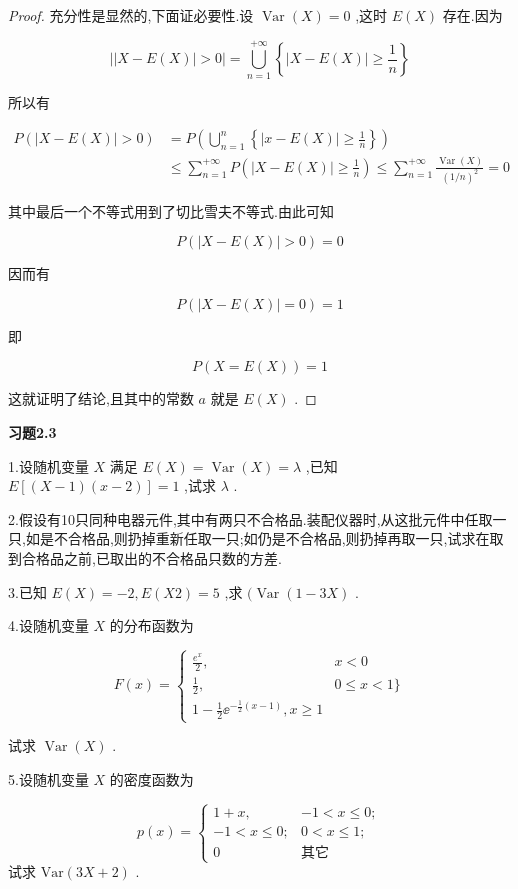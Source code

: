 \begin{proof}
	充分性是显然的,下面证必要性.设 $ \operatorname{Var}(X)=0 $ ,这时 $ E(X) $ 存在.因为
	
	\[
	| | X-E(X)|>0|=\bigcup_{n=1}^{+\infty}\left\{|X-E(X)| \geqslant \frac{1}{n}\right\}
	\]
	
	所以有
	
	\[
	\begin{aligned} P(|X-E(X)|>0) &=P\left(\bigcup_{n=1}^{n}\left\{|x-E(X)| \geqslant \frac{1}{n}\right\}\right) \\ & \leqslant \sum_{n=1}^{+\infty} P\left(|X-E(X)| \geqslant \frac{1}{n}\right) \leqslant \sum_{n=1}^{+\infty} \frac{\operatorname{Var}(X)}{(1 / n)^{2}}=0 \end{aligned}
	\]
	
	其中最后一个不等式用到了切比雪夫不等式.由此可知
	
	\[
	P(|X-E(X)|>0)=0
	\]
	
	因而有
	
	\[
	P(|X-E(X)|=0)=1
	\]
	
	即
	
	\[
	P(X=E(X))=1
	\]
	
	这就证明了结论,且其中的常数 $ a $ 就是 $ E(X) $ .
\end{proof}

\begin{center}
	\textbf{习题2.3}
\end{center}

1.设随机变量 $ X $ 满足 $ E(X)=\operatorname{Var}(X)=\lambda $ ,已知 $ E[(X-1)(x-2)]=1 $ ,试求 $ \lambda $ .

2.假设有10只同种电器元件,其中有两只不合格品.装配仪器时,从这批元件中任取一只,如是不合格品,则扔掉重新任取一只;如仍是不合格品,则扔掉再取一只,试求在取到合格品之前,已取出的不合格品只数的方差.

3.已知 $ E(X)=-2,E(X2)=5 $ ,求 $ (\operatorname{Var}(1-3 X) $ .

4.设随机变量 $ X $ 的分布函数为

\[
F(x)=\left\{\begin{array}{ll}{\frac{e^{x}}{2},} & {x<0} \\ {\frac{1}{2},} & {0 \leqslant x<1 \}} \\ {1-\frac{1}{2} \ee ^{-\frac{1}{2}(x-1)}, x \geqslant 1}\end{array}\right.
\]

试求 $ \operatorname{Var}(X) $ .

5.设随机变量 $ X $ 的密度函数为

\[
p(x)=\left\{\begin{array}{ll}
{1+x,} & {-1<x \leqslant 0 ;} \\ 
{-1<x \leqslant 0 ;} & {0<x \leqslant 1 ;} \\ 
{0} & {\text{其它}}
\end{array}\right.
\]
试求 $ \mathrm{Var}(3 X+2) $ .

